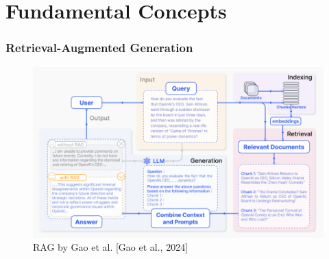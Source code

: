 \documentclass{beamer}
\begin{document}
\section[Fundamentals]{Fundamental Concepts}
\begin{frame}
  \frametitle{Retrieval-Augmented Generation}

  \begin{figure}
    \includegraphics[width=\textwidth]{Grafiken/rag-process.png}
    \caption{RAG by Gao et al. [Gao et al., 2024]}
  \end{figure}

  
\end{frame}
\end{document}

